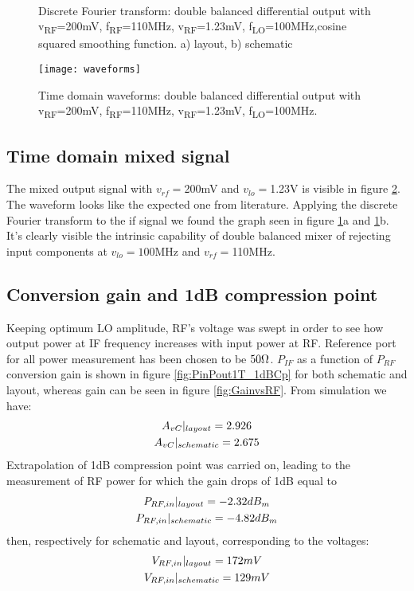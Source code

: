 \begin{figure}[H] 
	\centering
	 \\
	\caption{Discrete Fourier transform: double balanced differential output with v\textsubscript{RF}=200mV,  f\textsubscript{RF}=110MHz, v\textsubscript{RF}=1.23mV, f\textsubscript{LO}=100MHz,cosine squared smoothing function. a) layout, b) schematic}
	\label{fig:TdomaniDFT}
\end{figure}

\begin{figure}[H]
	\centering
	\texttt{[image: waveforms]}
	\caption{Time domain waveforms: double balanced differential output with v\textsubscript{RF}=200mV,  f\textsubscript{RF}=110MHz, v\textsubscript{RF}=1.23mV, f\textsubscript{LO}=100MHz.}
	\label{fig:TdomaniWF}
\end{figure}

\subsection{Time domain mixed signal}
The mixed output signal with \(v_{rf}=\)200mV and \(v_{lo}=\)1.23V is visible in figure \ref{fig:TdomaniWF}. The waveform looks like the expected one from literature.
Applying the discrete Fourier transform to the if signal we found the graph seen in figure \ref{fig:TdomaniDFT}a and \ref{fig:TdomaniDFT}b.
It's clearly visible the intrinsic capability of double balanced mixer of rejecting input components at \(v_{lo}=100\)MHz and \(v_{rf}=\)110MHz.

\subsection{Conversion gain and 1dB compression point}
Keeping optimum LO amplitude, RF's voltage was swept in order to see how output power at IF frequency increases with input power at RF. Reference port for all power measurement has been chosen to be \(50\ohm\). \(P_{IF}\) as a function of \(P_{RF}\) conversion gain is shown in figure \ref{fig:PinPout1T_1dBCp} for both schematic and layout, whereas gain can be seen in figure \ref{fig:GainvsRF}. 
From simulation we have:
\begin{gather}
A_{vC}|_{layout}=2.926 \notag \\ 
A_{vC}|_{schematic}=2.675 \notag
\end{gather}
Extrapolation of 1dB compression point was carried on, leading to the measurement of RF power for which the gain drops of 1dB equal to 
\begin{gather}
P_{RF,in}|_{layout}=-2.32dB_{m} \notag \\
P_{RF,in}|_{schematic}=-4.82dB_{m} \notag
\end{gather}
then, respectively for schematic and layout, corresponding to the voltages:
\begin{gather}
V_{RF,in}|_{layout}=172mV \notag \\
V_{RF,in}|_{schematic}=129mV \notag
\end{gather}



